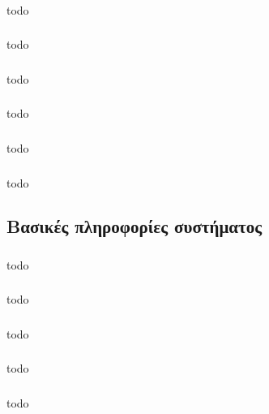 \documentclass[a4paper, 12pt]{article}
\begin{document}
		\subsubsection{}
			todo

		\subsubsection{}
			todo

		\subsubsection{}
			todo

		\subsubsection{}
			todo

		\subsubsection{}
			todo

		\subsubsection{}
			todo

	\subsection{Βασικές πληροφορίες συστήματος}

		\subsubsection{}
			todo

		\subsubsection{}
			todo

		\subsubsection{}
			todo

		\subsubsection{}
			todo

		\subsubsection{}
			todo
\end{document}
